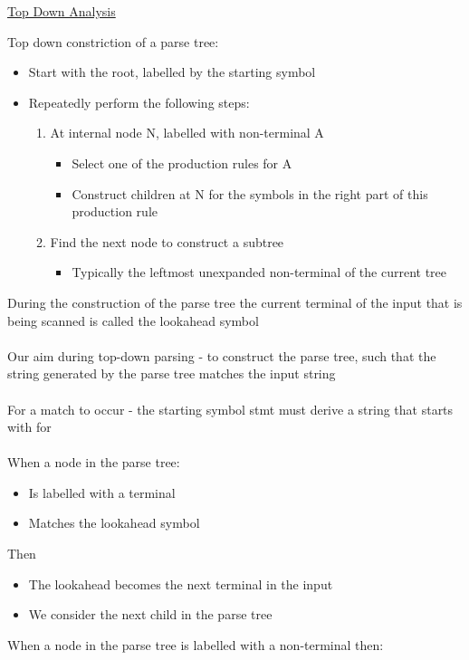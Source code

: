 \documentclass{article}[18pt]
\begin{document}
\begin{center}
\underline{\huge Top Down Analysis}
\end{center}
Top down constriction of a parse tree:
\begin{itemize}
	\item Start with the root, labelled by the starting symbol
	\item Repeatedly perform the following steps:
	\begin{enumerate}
		\item At internal node N, labelled with non-terminal A
		\begin{itemize}
			\item Select one of the production rules for A
			\item Construct children at N for the symbols in the right part of this production rule
		\end{itemize}
		\item Find the next node to construct a subtree
		\begin{itemize}
			\item Typically the leftmost unexpanded non-terminal of the current tree
		\end{itemize}
	\end{enumerate}
\end{itemize}
During the construction of the parse tree the current terminal of the input that is being scanned is called the lookahead symbol\\
\\
Our aim during top-down parsing - to construct the parse tree, such that the string generated by the parse tree matches the input string\\
\\
For a match to occur - the starting symbol stmt must derive a string that starts with for\\
\\
When a node in the parse tree:
\begin{itemize}
	\item Is labelled with a terminal
	\item Matches the lookahead symbol
\end{itemize}
Then
\begin{itemize}
	\item The lookahead becomes the next terminal in the input
	\item We consider the next child in the parse tree
\end{itemize}
When a node in the parse tree is labelled with a non-terminal then:
\end{document}

